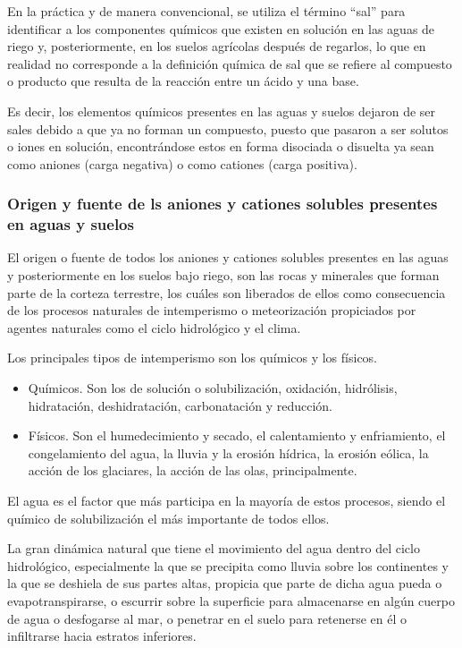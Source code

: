 En la práctica y de manera convencional, se utiliza el término “sal” para identificar a los componentes químicos que existen en solución en las aguas de riego y, posteriormente, en los suelos agrícolas después de regarlos, lo que en realidad no corresponde a la definición química de sal que se refiere al compuesto o producto que resulta de la reacción entre un ácido y una base.

Es decir, los elementos químicos presentes en las aguas y suelos dejaron de ser sales debido a que ya no forman un compuesto, puesto que pasaron a ser solutos o iones en solución, encontrándose estos en forma disociada o disuelta ya sean como aniones (carga negativa) o como cationes (carga positiva).

\subsubsection{Origen y fuente de ls aniones y cationes solubles presentes en aguas y suelos}
El origen o fuente de todos los aniones y cationes solubles presentes en las aguas y posteriormente en los suelos bajo riego, son las rocas y minerales que forman parte de la corteza terrestre, los cuáles son liberados de ellos como consecuencia de los procesos naturales de intemperismo o meteorización propiciados por agentes naturales como el ciclo hidrológico y el clima.

Los principales tipos de intemperismo son los químicos y los físicos.
\begin{itemize}
  \item Químicos. Son los de solución o solubilización, oxidación, hidrólisis, hidratación, deshidratación, carbonatación y reducción.
  \item Físicos. Son el humedecimiento y secado, el calentamiento y enfriamiento, el congelamiento del agua, la lluvia y la erosión hídrica, la erosión eólica, la acción de los glaciares, la acción de las olas, principalmente.  
\end{itemize}
El agua es el factor que más participa en la mayoría de estos procesos, siendo el químico de solubilización el más importante de todos ellos.

La gran dinámica natural que tiene el movimiento del agua dentro del ciclo hidrológico, especialmente la que se precipita como lluvia sobre los continentes y la que se deshiela de sus partes altas, propicia que parte de dicha agua pueda o evapotranspirarse, o escurrir sobre la superficie para almacenarse en algún cuerpo de agua o desfogarse al mar, o penetrar en el suelo para retenerse en él o infiltrarse hacia estratos inferiores.

